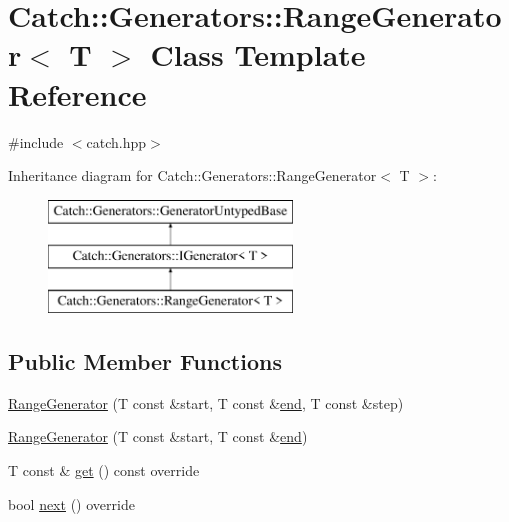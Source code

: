\hypertarget{class_catch_1_1_generators_1_1_range_generator}{}\section{Catch\+::Generators\+::Range\+Generator$<$ T $>$ Class Template Reference}
\label{class_catch_1_1_generators_1_1_range_generator}


{\ttfamily \#include $<$catch.\+hpp$>$}

Inheritance diagram for Catch\+::Generators\+::Range\+Generator$<$ T $>$\+:\begin{figure}[H]
\begin{center}
\leavevmode
\includegraphics[height=3.000000cm]{class_catch_1_1_generators_1_1_range_generator}
\end{center}
\end{figure}
\subsection*{Public Member Functions}
\begin{DoxyCompactItemize}
\item 
\mbox{\hyperlink{class_catch_1_1_generators_1_1_range_generator_a6a9b3cc009471c085c985642e0ab102e}{Range\+Generator}} (T const \&start, T const \&\mbox{\hyperlink{namespace_catch_a71fef6a57614eb2d9751f8586ff6de6a}{end}}, T const \&step)
\item 
\mbox{\hyperlink{class_catch_1_1_generators_1_1_range_generator_ac999eb143945ff311b97d2c767df90d3}{Range\+Generator}} (T const \&start, T const \&\mbox{\hyperlink{namespace_catch_a71fef6a57614eb2d9751f8586ff6de6a}{end}})
\item 
T const  \& \mbox{\hyperlink{class_catch_1_1_generators_1_1_range_generator_a2639173bb9f06ba353314cd226fcefec}{get}} () const override
\item 
bool \mbox{\hyperlink{class_catch_1_1_generators_1_1_range_generator_a4e6b2038832f09724d5a4355b4691259}{next}} () override
\end{DoxyCompactItemize}
